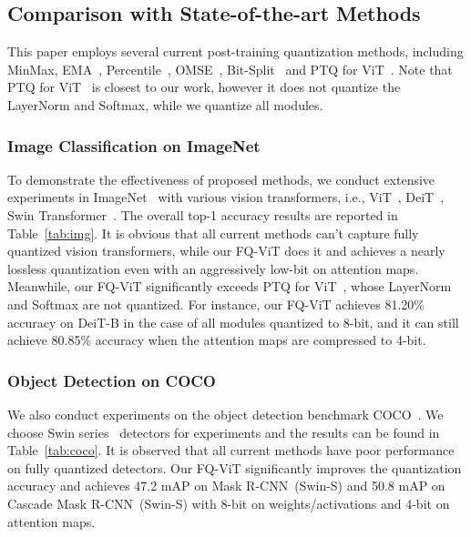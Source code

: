\documentclass{article}
\begin{document}
\subsection{Comparison with State-of-the-art Methods}
This paper employs several current post-training quantization methods, including MinMax, EMA~\cite{jacob2018quantization}, Percentile~\cite{li2019fully}, OMSE~\cite{choukroun2019low}, Bit-Split~\cite{wang2020towards} and PTQ for ViT~\cite{liu2021post}.
Note that PTQ for ViT~\cite{liu2021post} is closest to our work, however it does not quantize the LayerNorm and Softmax, while we quantize all modules.


\subsubsection{Image Classification on ImageNet}

To demonstrate the effectiveness of proposed methods, we conduct extensive experiments in ImageNet~\cite{krizhevsky2012imagenet} with various vision transformers, i.e., ViT~\cite{dosovitskiy2021an}, DeiT~\cite{touvron2021training}, Swin Transformer~\cite{liu2021swin}.
The overall top-1 accuracy results are reported in Table~\ref{tab:img}.
It is obvious that all current methods can’t capture fully quantized vision transformers, while our FQ-ViT does it and achieves a nearly lossless quantization even with an aggressively low-bit on attention maps. Meanwhile, our FQ-ViT significantly exceeds PTQ for ViT~\cite{liu2021post}, whose LayerNorm and Softmax are not quantized. For instance, our FQ-ViT achieves 81.20\% accuracy on DeiT-B in the case of all modules quantized to 8-bit, and it can still achieve 80.85\% accuracy when the attention maps are compressed to 4-bit.


\subsubsection{Object Detection on COCO}

We also conduct experiments on the object detection benchmark COCO~\cite{lin2014microsoft}. We choose Swin series~\cite{liu2021swin} detectors for experiments and the results can be found in Table~\ref{tab:coco}. It is observed that all current methods have poor performance on fully quantized detectors. 
Our FQ-ViT  significantly improves the quantization accuracy and achieves 47.2 mAP on Mask R-CNN~(Swin-S) and 50.8 mAP on Cascade Mask R-CNN~(Swin-S) with 8-bit on weights/activations and 4-bit on attention maps.
\end{document}
